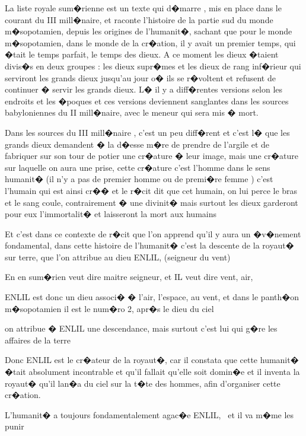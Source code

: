 \documentclass{article}
\begin{document}
La liste royale sum�rienne est un texte qui d�marre , mis en place dans le courant du III mill�naire, et raconte l'histoire de la partie sud du monde m�sopotamien, depuis les origines de l'humanit�, sachant que pour le monde m�sopotamien, dans le monde de la cr�ation, il y avait un premier temps, qui �tait le temps parfait, le temps des dieux. A ce moment les dieux �taient divis�s en deux groupes : les dieux supr�mes et les dieux de rang inf�rieur qui serviront les grands dieux jusqu'au jour o� ils se r�voltent et refusent de continuer � servir les grands dieux. L� il y a diff�rentes versions selon les endroits et les �poques et ces versions deviennent sanglantes dans les sources babyloniennes du II mill�naire, avec le meneur qui sera mis � mort.

Dans les sources du III mill�naire , c'est un peu diff�rent et c'est l� que les grands dieux demandent � la d�esse m�re de prendre de l'argile et de fabriquer sur son tour de potier une cr�ature � leur image, mais une cr�ature sur laquelle on aura une prise, cette cr�ature c'est l'homme dans le sens humanit� (il n'y a pas de premier homme ou de premi�re femme ) c'est l'humain qui est ainsi cr�� et le r�cit dit que cet humain, on lui perce le bras et le sang coule, contrairement � une divinit� mais surtout les dieux garderont pour eux l'immortalit� et laisseront la mort aux humains

Et c'est dans ce contexte de r�cit que l'on apprend qu'il y aura un �v�nement fondamental, dans cette histoire de l'humanit� c'est la descente de la royaut� sur terre, que l'on attribue au dieu ENLIL, (seigneur du vent)

En en sum�rien veut dire maitre seigneur, et IL veut dire vent, air, 

ENLIL est donc un dieu associ� � l'air, l'espace, au vent, et dans le panth�on m�sopotamien il est le num�ro 2, apr�s le dieu du ciel

on attribue � ENLIL une descendance, mais surtout c'est lui qui g�re les affaires de la terre


\bigskip

Donc ENLIL est le cr�ateur de la royaut�, car il constata que cette humanit� �tait absolument incontrable et qu'il fallait qu'elle soit domin�e et il inventa la royaut� qu'il lan�a du ciel sur la t�te des hommes, afin d'organiser cette cr�ation. 

L'humanit� a toujours fondamentalement agac�e ENLIL, \ et il va m�me les punir


\bigskip
\end{document}
